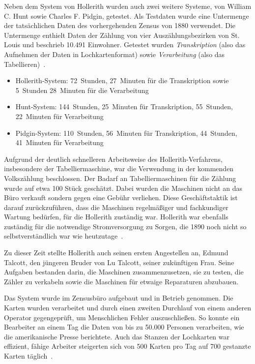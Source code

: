 \documentclass[parskip=half]{scrartcl}
\begin{document}
Neben dem System von Hollerith wurden auch zwei weitere Systeme, von William C.
Hunt sowie Charles F. Pidgin, getestet. Als Testdaten wurde eine Untermenge der
tatsächlichen Daten des vorhergehenden Zensus von 1880 verwendet. Die
Untermenge enthielt Daten der Zählung von vier Auszählungsbezirken von St.
Louis und beschrieb 10.491 Einwohner. Getestet wurden \emph{Transkription}
(also das Aufnehmen der Daten in Lochkartenformat) sowie \emph{Verarbeitung}
(also das Tabellieren)~\cite{austrian1982herman}.

\begin{itemize}
  \item Hollerith-System: 72~Stunden, 27~Minuten für die Transkription sowie
    5~Stunden 28~Minuten für die Verarbeitung
  \item Hunt-System: 144~Stunden, 25~Minuten für Transkription, 55~Stunden,
    22~Minuten für Verarbeitung
  \item Pidgin-System: 110~Stunden, 56~Minuten für Transkription,
    44~Stunden, 41~Minuten für Verarbeitung
\end{itemize}

Aufgrund der deutlich schnelleren Arbeitsweise des Hollerith-Verfahrens,
insbesondere der Tabelliermaschine, war die Verwendung in der kommenden
Volkszählung beschlossen. Der Badarf an Tabelliermaschinen für die Zählung
wurde auf etwa 100 Stück geschätzt. Dabei wurden die Maschinen nicht an das
Büro verkauft sondern gegen eine Gebühr verliehen. Diese Geschäftstaktik ist
darauf zurückzuführen, dass die Maschinen regelmäßiger und fachkundiger Wartung
bedürfen, für die Hollerith zuständig war. Hollerith war ebenfalls zuständig
für die notwendige Stromversorgung zu Sorgen, die 1890 noch nicht so
selbstverständlich war wie heutzutage~\cite{austrian1982herman}.

Zu dieser Zeit stellte Hollerith auch seinen ersten Angestellen an, Edmund
Talcott, den jüngeren Bruder von Lu Talcott, seiner zukünftigen Frau. Seine
Aufgaben bestanden darin, die Maschinen zusammenzusetzen, sie zu testen, die
Zähler zu verkabeln sowie die Maschinen für etwaige Reparaturen abzubauen.

Das System wurde im Zensusbüro aufgebaut und in Betrieb genommen. Die Karten
wurden verarbeitet und durch einen zweiten Durchlauf von einem anderen Operator
gegengeprüft, um Menschlichen Fehler auszuschließen. So konnte ein Bearbeiter
an einem Tag die Daten von bis zu 50.000 Personen verarbeiten, wie die
amerikanische Presse berichtete. Auch das Stanzen der Lochkarten war effizient,
fähige Arbeiter steigerten sich von 500 Karten pro Tag auf 700 gestanzte Karten
täglich~\cite{austrian1982herman}.
\end{document}
